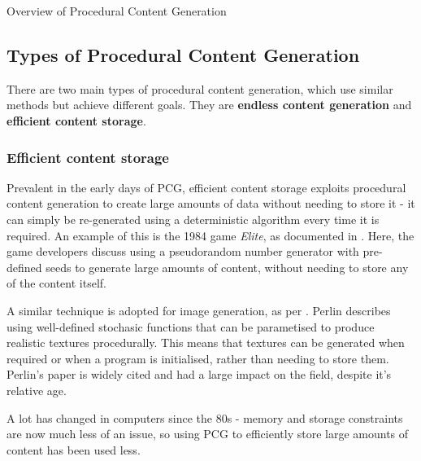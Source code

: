 \documentclass[review]{cmpreport}
\begin{document}
\begin{section}{Overview of Procedural Content Generation}
\subsection{Types of Procedural Content Generation}
There are two main types of procedural content generation, which use similar methods but achieve different goals. They are \textbf{endless content generation} and \textbf{efficient content storage}.

\subsubsection{Efficient content storage}
Prevalent in the early days of PCG, efficient content storage exploits procedural content generation to create large amounts of data without needing to store it - it can simply be re-generated using a deterministic algorithm every time it is required. An example of this is the 1984 game \textit{Elite}, as documented in \citet{spufford_2003}. Here, the game developers discuss using a pseudorandom number generator with pre-defined seeds to generate large amounts of content, without needing to store any of the content itself. \par
A similar technique is adopted for image generation, as per \cite{Perlin:1985:IS:325165.325247}. Perlin describes using well-defined stochasic functions that can be parametised to produce realistic textures procedurally. This means that textures can be generated when required or when a program is initialised, rather than needing to store them. Perlin's paper is widely cited and had a large impact on the field, despite it's relative age.\par
A lot has changed in computers since the 80s - memory and storage constraints are now much less of an issue, so using PCG to efficiently store large amounts of content has been used less.


\end{section}
\end{document}
